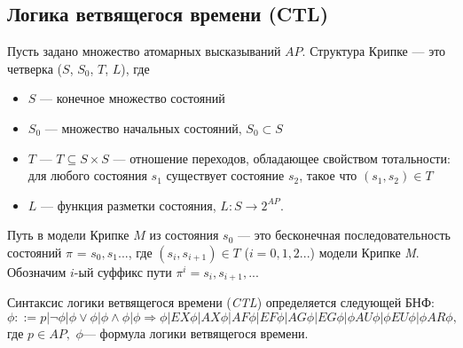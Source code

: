 \documentclass[12pt]{article}
\begin{document}
  
\subsection{Логика ветвящегося времени (CTL)}

Пусть задано множество атомарных высказываний $AP$.
Структура Крипке — это четверка ($S$, $S_{0}$, $T$, $L$), где
\begin{itemize}
    \item $S$ — конечное множество состояний
    \item $S_{0}$ — множество начальных состояний, $S_{0} \subset S $
    \item $T$ — $T \subseteq S \times S$ — отношение переходов, обладающее свойством тотальности: для любого состояния $s_1$ существует состояние $s_2$, такое что $(s_1, s_2) \in T$
    \item $L$ — функция разметки состояния, $L: S \rightarrow 2^{AP} $.
\end{itemize}

Путь в модели Крипке $M$ из состояния $s_0$ — это бесконечная последовательность состояний $\pi$ = $s_0, s_1...$, где $(s_{i}, s_{i+1}) \in T$ ($i = 0, 1, 2...$) модели Крипке \textit{M}. 
Обозначим $i$-ый суффикс пути $\pi^{i} = s_{i}, s_{i+1},...$

Синтаксис логики ветвящегося времени (\textit{CTL}) определяется следующей БНФ:
$$\phi ::= p | \neg \phi | \phi \vee \phi | \phi \wedge \phi | 
\phi \Rightarrow \phi| EX\phi | AX\phi | AF\phi | EF\phi | AG\phi | EG\phi | \phi AU \phi|\phi EU \phi| \phi AR \phi,$$
где $p \in AP,$ $\phi$— формула логики ветвящегося времени.
\end{document}
